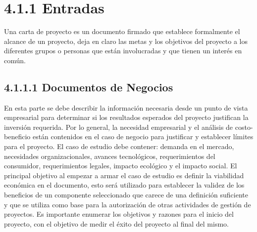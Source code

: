 \documentclass[letterpaper,12pt,openright,oneside]{article}
\theoremstyle{plain}
\begin{document}
\section*{4.1.1 Entradas}
% 
% 

Una carta de proyecto es un documento firmado que establece formalmente el alcance de un proyecto, deja en claro las metas y los objetivos del proyecto a los diferentes grupos o personas que están involucradas y que tienen un interés en común.

\subsection*{4.1.1.1 Documentos de Negocios}

En esta parte se debe describir la información necesaria desde un punto de vista empresarial para determinar si los resultados esperados del proyecto justifican la inversión requerida. Por lo general, la necesidad empresarial y el análisis de costo-beneficio están contenidos en el caso de negocio para justificar y establecer límites para el proyecto. El caso de estudio debe contener: demanda en el mercado, necesidades organizacionales, avances tecnológicos, requerimientos del consumidor, requerimientos legales, impacto ecológico y el impacto social. 
El principal objetivo al empezar a armar el caso de estudio es definir la viabilidad económica en el documento, esto será utilizado para establecer la validez de los beneficios de un componente seleccionado que carece de una definición suficiente y que se utiliza como base para la autorización de otras actividades de gestión de proyectos. Es importante enumerar los objetivos y razones para el inicio del proyecto, con el objetivo de medir el éxito del proyecto al final del mismo.

% 
% 
\end{document}
